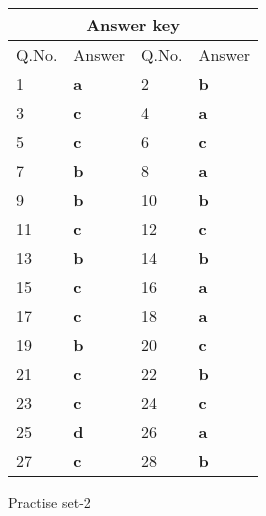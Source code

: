 \begin{table}[H]
	\centering
	\begin{tabular}{|p{1.5cm}|p{1.5cm}||p{1.5cm}|p{1.5cm}|}
		\hline
		\multicolumn{4}{|c|}{\textbf{Answer key}}\\\hline\hline
		\rowcolor{ocrel}Q.No.&Answer&Q.No.&Answer\\\hline
		1&\textbf{a} &2&\textbf{b}\\\hline
		3&\textbf{c} &4&\textbf{a} \\\hline
		5&\textbf{c} &6&\textbf{c} \\\hline
		7&\textbf{b}&8&\textbf{a}\\\hline
		9&\textbf{b}&10&\textbf{b}\\\hline
		11&\textbf{c} &12&\textbf{c}\\\hline
		13&\textbf{b}&14&\textbf{b}\\\hline
		15&\textbf{c}&16 &\textbf{a}\\\hline
		17&\textbf{c}&18 &\textbf{a}\\\hline
		19&\textbf{b}&20&\textbf{c}\\\hline
		21&\textbf{c} &22&\textbf{b}\\\hline
		23&\textbf{c}&24&\textbf{c}\\\hline
		25&\textbf{d}&26 &\textbf{a}\\\hline
		27&\textbf{c}&28 &\textbf{b}\\\hline
	\end{tabular}
\end{table}
\newpage
\begin{abox}
	Practise set-2
\end{abox}

